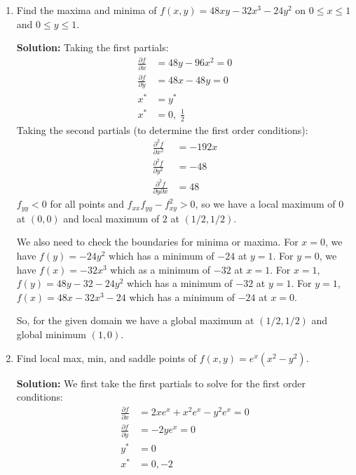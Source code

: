 \documentclass[letterpaper, 11pt]{article}
\begin{document}
\begin{enumerate}
\item Find the maxima and minima of $f(x,y) = 48xy - 32x^3 - 24y^2$ on $0 \leq x \leq 1$ and $ 0 \leq y \leq 1$.
\par \textbf{Solution:} Taking the first partials:
\begin{align*}
\frac{ \partial f}{\partial x} &= 48 y - 96x^2 = 0 \\
\frac{ \partial f}{\partial y} &= 48 x - 48 y = 0\\
x^* &= y^* \\
x^* &= 0, \; \frac{1}{2} 
\end{align*}
Taking the second partials (to determine the first order conditions):
\begin{align*}
\frac{ \partial^2 f}{\partial x^2} &= - 192x \\
\frac{ \partial^2 f}{\partial y^2} &= - 48 \\
\frac{ \partial^2 f}{\partial y \partial x} &= 48 
\end{align*}
$f_{yy} < 0$ for all points and $f_{xx} f_{yy}  - f_{xy}^2 > 0$, so we have a local maximum of $0$ at $(0,0)$ and local maximum of $2$ at $(1/2,1/2)$.

\par We also need to check the boundaries for minima or maxima. For $x = 0$, we have $f(y) = -24y^2$ which has a minimum of $-24$ at $y = 1$. For $ y = 0$, we have $f(x) = -32 x^3$ which as a minimum of $-32$ at $x = 1$. For $x = 1$, $f(y) = 48 y - 32 - 24y^2$ which has a minimum of $-32$ at $ y = 1$. For $ y = 1$, $f(x) = 48x - 32x^3 - 24$ which has a minimum of $-24$ at $x = 0$. 

\par So, for the given domain we have a global maximum at $(1/2,1/2)$ and global minimum $(1,0)$. 

\item Find local max, min, and saddle points of $f(x,y) = e^x(x^2 - y^2)$. 
\par \textbf{Solution:} We first take the first partials to solve for the first order conditions:
\begin{align*}
\frac{ \partial f}{\partial x} &= 2x e^x + x^2 e^x - y^2 e^x  = 0\\
\frac{ \partial f}{\partial y} &= -2ye^x = 0 \\
y^* &= 0\\
x^* &= 0, -2
\end{align*}


\end{enumerate}
\end{document}
